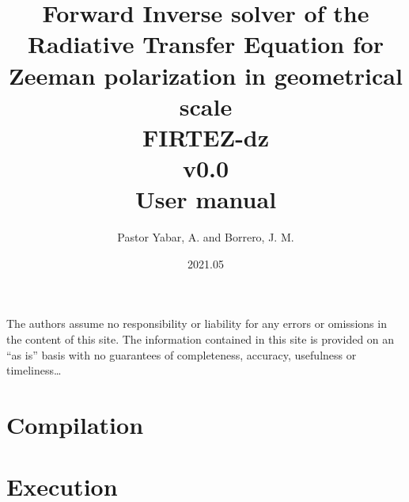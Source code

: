 \documentclass[12pt,a4]{article}
\begin{document}
\title{Forward Inverse solver of the Radiative Transfer Equation for Zeeman polarization in geometrical scale\\{\bf FIRTEZ-dz}\\v0.0\\User manual}
\author{Pastor Yabar, A. and Borrero, J. M.}
\date{2021.05}
\maketitle

\clearpage
\tableofcontents
%
\clearpage
\vspace*{\fill}
\noindent The authors assume no responsibility or liability for any errors or omissions in the content of this site. The information contained in this site is provided on an ``as is'' basis with no guarantees of completeness, accuracy, usefulness or timeliness\ldots
%
\clearpage
\section{Compilation}

%
\clearpage
\section{Execution}

\end{document}
